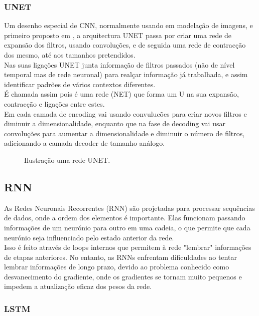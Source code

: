 \subsubsection{UNET\label{se:unet_sec}}

Um desenho especial de \gls{CNN}, normalmente usando em modelação de imagens, e primeiro proposto em \cite{Shelhamer2014}, a arquitectura UNET passa por criar uma rede de expansão dos filtros, usando convoluções, e de seguida uma rede de contracção dos mesmo, até aos tamanhos pretendidos.\\
Nas suas ligações UNET junta informação de filtros passados (não de nível temporal mas de rede neuronal) para realçar informação já trabalhada, e assim identificar padrões de vários contextos diferentes.\\
É chamada assim pois é uma rede (NET) que forma um U na sua expansão, contracção e ligações entre estes.\\
Em cada camada de encoding vai usando convulucões para criar novos filtros e diminuir a dimensionalidade, enquanto que na fase de decoding vai usar convoluções para aumentar a dimensionalidade e diminuir o número de filtros, adicionando a camada decoder de tamanho análogo.\\

\begin{figure}[H]
	\centering
	\resizebox{\linewidth}{!}{}
	\caption{Ilustração uma rede UNET.}
	\label{fig:unet_graph}
\end{figure}


\subsection{RNN\label{se:rnn_sec}}

As Redes Neuronais Recorrentes (RNN) são projetadas para processar sequências de dados, onde a ordem dos elementos é importante. Elas funcionam passando informações de um neurónio para outro em uma cadeia, o que permite que cada neurónio seja influenciado pelo estado anterior da rede.\\
Isso é feito através de loops internos que permitem à rede "lembrar" informações de etapas anteriores. No entanto, as RNNs enfrentam dificuldades ao tentar lembrar informações de longo prazo, devido ao problema conhecido como desvanecimento do gradiente, onde os gradientes se tornam muito pequenos e impedem a atualização eficaz dos pesos da rede.\\

\subsubsection{LSTM\label{se:lstms_sec}}

